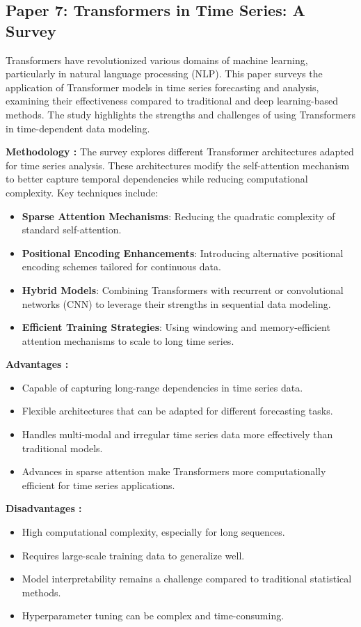\documentclass[11pt]{report}
\begin{document}
\subsection{Paper 7: Transformers in Time Series: A Survey}

Transformers have revolutionized various domains of machine learning, particularly in natural language processing (NLP). This paper surveys the application of Transformer models in time series forecasting and analysis, examining their effectiveness compared to traditional and deep learning-based methods. The study highlights the strengths and challenges of using Transformers in time-dependent data modeling.

\textbf{Methodology : }
The survey explores different Transformer architectures adapted for time series analysis. These architectures modify the self-attention mechanism to better capture temporal dependencies while reducing computational complexity. Key techniques include:
\begin{itemize}
    \item 	\textbf{Sparse Attention Mechanisms}: Reducing the quadratic complexity of standard self-attention.
    \item 	\textbf{Positional Encoding Enhancements}: Introducing alternative positional encoding schemes tailored for continuous data.
    \item 	\textbf{Hybrid Models}: Combining Transformers with recurrent or convolutional networks (CNN) to leverage their strengths in sequential data modeling.
    \item 	\textbf{Efficient Training Strategies}: Using windowing and memory-efficient attention mechanisms to scale to long time series.
\end{itemize}

\textbf{Advantages : }
\begin{itemize}
    \item Capable of capturing long-range dependencies in time series data.
    \item Flexible architectures that can be adapted for different forecasting tasks.
    \item Handles multi-modal and irregular time series data more effectively than traditional models.
    \item Advances in sparse attention make Transformers more computationally efficient for time series applications.
\end{itemize}

\textbf{Disadvantages : }
\begin{itemize}
    \item High computational complexity, especially for long sequences.
    \item Requires large-scale training data to generalize well.
    \item Model interpretability remains a challenge compared to traditional statistical methods.
    \item Hyperparameter tuning can be complex and time-consuming.
\end{itemize}
\end{document}
